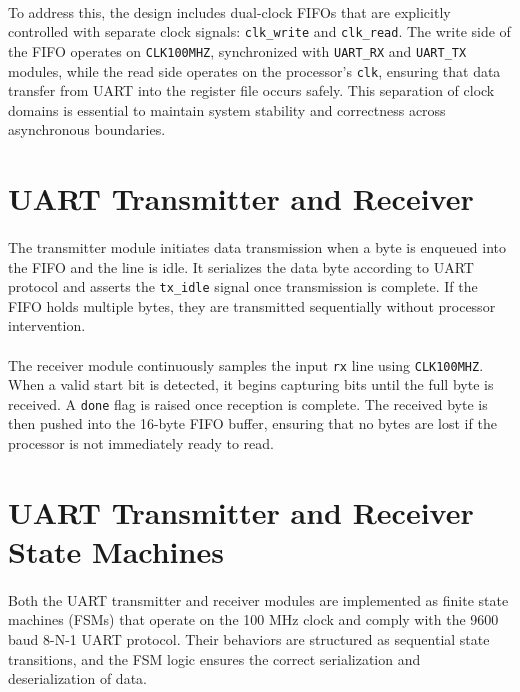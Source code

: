 \documentclass[12pt]{report}
\begin{document}
\paragraph{}
To address this, the design includes dual-clock FIFOs that are explicitly controlled with separate clock signals: \texttt{clk\_write} and \texttt{clk\_read}. The write side of the FIFO operates on \texttt{CLK100MHZ}, synchronized with \texttt{UART\_RX} and \texttt{UART\_TX} modules, while the read side operates on the processor’s \texttt{clk}, ensuring that data transfer from UART into the register file occurs safely. This separation of clock domains is essential to maintain system stability and correctness across asynchronous boundaries.

\section{UART Transmitter and Receiver}

\paragraph{}
The transmitter module initiates data transmission when a byte is enqueued into the FIFO and the line is idle. It serializes the data byte according to UART protocol and asserts the \texttt{tx\_idle} signal once transmission is complete. If the FIFO holds multiple bytes, they are transmitted sequentially without processor intervention.

\paragraph{}
The receiver module continuously samples the input \texttt{rx} line using \texttt{CLK100MHZ}. When a valid start bit is detected, it begins capturing bits until the full byte is received. A \texttt{done} flag is raised once reception is complete. The received byte is then pushed into the 16-byte FIFO buffer, ensuring that no bytes are lost if the processor is not immediately ready to read.

\section*{UART Transmitter and Receiver State Machines}

\paragraph{}
Both the UART transmitter and receiver modules are implemented as finite state machines (FSMs) that operate on the 100 MHz clock and comply with the 9600 baud 8-N-1 UART protocol. Their behaviors are structured as sequential state transitions, and the FSM logic ensures the correct serialization and deserialization of data.
\end{document}
